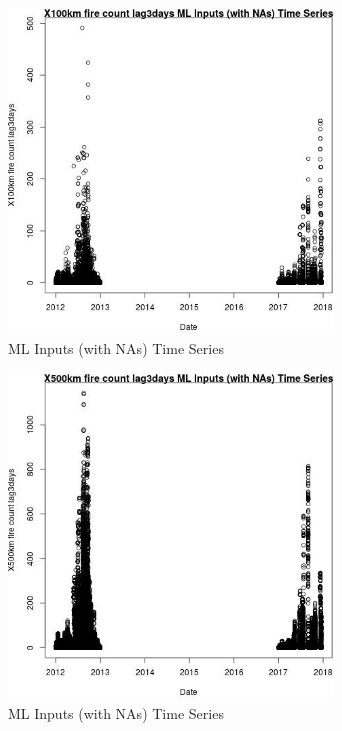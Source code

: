 \begin{figure} 
\centering  
\includegraphics[width=0.77\textwidth]{Code_Outputs/Report_ML_input_PM25_Step4_part_e_de_duplicated_aves_compiled_2019-05-14wNAs_X100km_fire_count_lag3daysvDate.jpg} 
\caption{\label{fig:Report_ML_input_PM25_Step4_part_e_de_duplicated_aves_compiled_2019-05-14wNAsX100km_fire_count_lag3daysvDate}ML Inputs (with NAs) Time Series} 
\end{figure} 
 

\begin{figure} 
\centering  
\includegraphics[width=0.77\textwidth]{Code_Outputs/Report_ML_input_PM25_Step4_part_e_de_duplicated_aves_compiled_2019-05-14wNAs_X500km_fire_count_lag3daysvDate.jpg} 
\caption{\label{fig:Report_ML_input_PM25_Step4_part_e_de_duplicated_aves_compiled_2019-05-14wNAsX500km_fire_count_lag3daysvDate}ML Inputs (with NAs) Time Series} 
\end{figure} 
 

